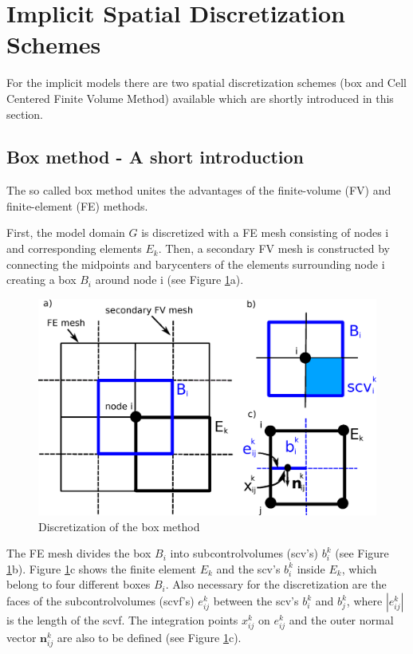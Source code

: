 \section{Implicit Spatial Discretization Schemes}\label{spatialdiscretization}

For the implicit models there are two spatial discretization schemes (box and Cell Centered Finite Volume Method) available which are shortly introduced 
in this section.

\subsection{Box method - A short introduction}\label{box}

The so called box method unites the advantages of the finite-volume (FV) and finite-element (FE) methods. 

First, the model domain $G$ is discretized with a FE mesh consisting of nodes i and corresponding elements $E_k$. Then, a secondary FV mesh is constructed by connecting the midpoints and barycenters of the elements surrounding node i creating a box $B_i$ around node i (see Figure \ref{pc:box}a). 

\begin{figure} [h]
\includegraphics[width=0.8\linewidth,keepaspectratio]{EPS/box_disc}
\caption{\label{pc:box} Discretization of the box method}
\end{figure}

The FE mesh divides the box $B_i$ into subcontrolvolumes (scv's) $b^k_i$ (see Figure \ref{pc:box}b). Figure \ref{pc:box}c shows the finite element $E_k$ and the scv's $b^k_i$ inside $E_k$, which belong to four different boxes $B_i$. Also necessary for the discretization are the faces of the subcontrolvolumes (scvf's) $e^k_{ij}$ between the scv's $b^k_i$ and $b^k_j$, where $|e^k_{ij}|$ is the length of the scvf. The integration points $x^k_{ij}$ on $e^k_{ij}$ and the outer normal vector $\mathbf n^k_{ij}$ are also to be defined (see Figure \ref{pc:box}c).

